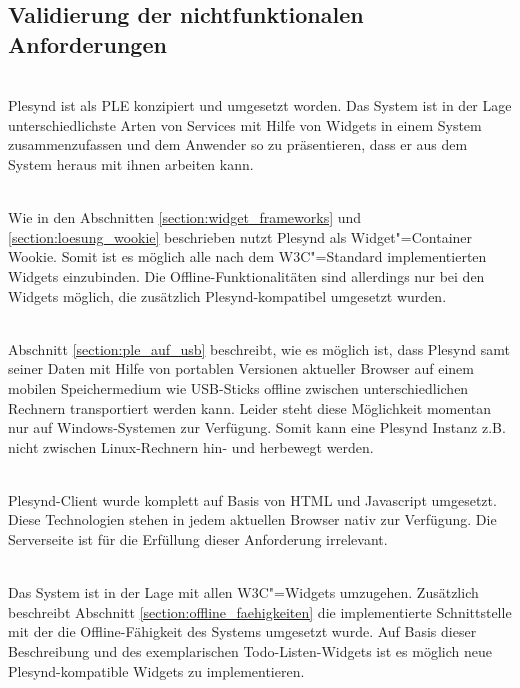 \subsection{Validierung der nichtfunktionalen Anforderungen}
\textbullet{}  \emph{\requirementAggregator}\\
Plesynd ist als \ac{PLE} konzipiert und umgesetzt worden. Das System ist in der Lage unterschiedlichste Arten von Services mit Hilfe von Widgets in einem System zusammenzufassen und dem Anwender so zu präsentieren, dass er aus dem System heraus mit ihnen arbeiten kann.

\textbullet{}  \emph{\requirementWidgetStandard}\\
Wie in den Abschnitten \ref{section:widget_frameworks} und \ref{section:loesung_wookie} beschrieben nutzt Plesynd als Widget"=Container Wookie. Somit ist es möglich alle nach dem \ac{W3C}"=Standard implementierten Widgets einzubinden. Die Offline-Funktionalitäten sind allerdings nur bei den Widgets möglich, die zusätzlich Plesynd-kompatibel umgesetzt wurden.

\textbullet{}  \emph{\requirementUsbStick}\\
Abschnitt \ref{section:ple_auf_usb} beschreibt, wie es möglich ist, dass Plesynd samt seiner Daten mit Hilfe von portablen Versionen aktueller Browser auf einem mobilen Speichermedium wie USB-Sticks offline zwischen unterschiedlichen Rechnern transportiert werden kann. Leider steht diese Möglichkeit momentan nur auf Windows-Systemen zur Verfügung. Somit kann eine Plesynd Instanz z.B. nicht zwischen Linux-Rechnern hin- und herbewegt werden. 

\textbullet{}  \emph{\requirementUsageInBrowser}\\
Plesynd-Client wurde komplett auf Basis von \ac{HTML} und Javascript umgesetzt. Diese Technologien stehen in jedem aktuellen Browser nativ zur Verfügung. Die Serverseite ist für die Erfüllung dieser Anforderung irrelevant.

\textbullet{}  \emph{\requirementNewWidgetsWithApi}\\
Das System ist in der Lage mit allen \ac{W3C}"=Widgets umzugehen. Zusätzlich beschreibt Abschnitt \ref{section:offline_faehigkeiten} die implementierte Schnittstelle mit der die Offline-Fähigkeit des Systems umgesetzt wurde. Auf Basis dieser Beschreibung und des exemplarischen Todo-Listen-Widgets ist es möglich neue Plesynd-kompatible Widgets zu implementieren.

